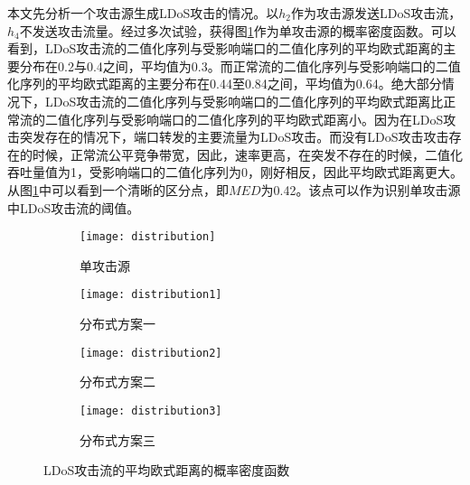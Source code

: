 本文先分析一个攻击源生成LDoS攻击的情况。以$h_2$作为攻击源发送LDoS攻击流，$h_4$不发送攻击流量。经过多次试验，获得图\ref{fig:PDF-single}作为单攻击源的概率密度函数。可以看到，LDoS攻击流的二值化序列与受影响端口的二值化序列的平均欧式距离的主要分布在0.2与0.4之间，平均值为0.3。而正常流的二值化序列与受影响端口的二值化序列的平均欧式距离的主要分布在0.44至0.84之间，平均值为0.64。绝大部分情况下，LDoS攻击流的二值化序列与受影响端口的二值化序列的平均欧式距离比正常流的二值化序列与受影响端口的二值化序列的平均欧式距离小。因为在LDoS攻击突发存在的情况下，端口转发的主要流量为LDoS攻击。而没有LDoS攻击攻击存在的时候，正常流公平竞争带宽，因此，速率更高，在突发不存在的时候，二值化吞吐量值为1，受影响端口的二值化序列为0，刚好相反，因此平均欧式距离更大。从图\ref{fig:PDF-single}中可以看到一个清晰的区分点，即$MED$为0.42。该点可以作为识别单攻击源中LDoS攻击流的阈值。


\begin{figure}
    \begin{subfigure}{.49\textwidth}
        \centering
        \texttt{[image: distribution]}
        \caption{单攻击源}
        \label{fig:PDF-single}
    \end{subfigure}
    \begin{subfigure}{.49\textwidth}
        \centering
        \texttt{[image: distribution1]}
        \caption{分布式方案一}
        \label{fig:PDF-2h-mod1}
    \end{subfigure}

    \begin{subfigure}{.49\textwidth}
        \centering
        \texttt{[image: distribution2]}
        \caption{分布式方案二}
        \label{fig:PDF-2h-mod2}
    \end{subfigure}
    \begin{subfigure}{.49\textwidth}
        \centering
        \texttt{[image: distribution3]}
        \caption{分布式方案三}
        \label{fig:PDF-2h-mod3}
    \end{subfigure}


    \caption{LDoS攻击流的平均欧式距离的概率密度函数}
    \label{fig:PDF-all}
\end{figure}




